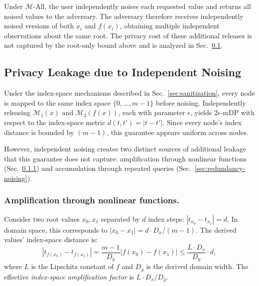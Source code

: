 \begin{remark}
\label{rem:m-all-contrast}
Under $\mathcal{M}$-All, the user independently noises each requested value and returns all noised values to the adversary. The adversary therefore receives independently noised versions of both $x_i$ and $f(x_i)$, obtaining multiple independent observations about the same root. The privacy cost of these additional releases is not captured by the root-only bound above and is analyzed in Sec.~\ref{sec:privacy-leakage}.
\end{remark}

\subsection{Privacy Leakage due to Independent Noising}
\label{sec:privacy-leakage}



Under the index-space mechanisms described in Sec.~\ref{sec:sanitization}, every node is mapped to the same index space $\{0, \ldots, m{-}1\}$ before noising. Independently releasing $\mathcal{M}_1(x)$ and $\mathcal{M}_2(f(x))$, each with parameter $\epsilon$, yields $2\epsilon$-mDP with respect to the index-space metric $d(t,t') = |t - t'|$. Since every node's index distance is bounded by $(m{-}1)$, this guarantee appears uniform across nodes.

However, independent noising creates two distinct sources of additional leakage that this guarantee does not capture: amplification through nonlinear functions (Sec.~\ref{sec:nonlinear-amplification}) and accumulation through repeated queries (Sec.~\ref{sec:redundancy-noising}).
 
\subsubsection{\textbf{Amplification through nonlinear functions.}}
\label{sec:nonlinear-amplification}
 
Consider two root values $x_0, x_1$ separated by $d$ index steps: $|t_{x_0} - t_{x_1}| = d$. In domain space, this corresponds to $|x_0 - x_1| = d \cdot D_x / (m{-}1)$. The derived values' index-space distance is:
\[
    |t_{f(x_0)} - t_{f(x_1)}| = \frac{m-1}{D_y}|f(x_0) - f(x_1)| \leq \frac{L \cdot D_x}{D_y} \cdot d,
\]
where $L$ is the Lipschitz constant of $f$ and $D_y$ is the derived domain width. The effective \emph{index-space amplification factor} is $L \cdot D_x / D_y$.
 

